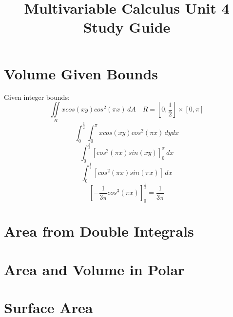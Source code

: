 \documentclass{article}
\title{Multivariable Calculus Unit 4 Study Guide}
\author{}
\date{}
\begin{document}
\maketitle

\section{Volume Given Bounds}
Given integer bounds:
\[
\iint\limits_{R} xcos(xy)cos^2(\pi x)\, dA \quad R = [0, \frac{1}{2}] \times [0, \pi ]
\]
\[
\int_{0}^{\frac{1}{2}} \int_{0}^{\pi} xcos(xy)cos^2(\pi x)\, dydx    
\]
\[
\int_{0}^{\frac{1}{2}} \left[ cos^{2}(\pi x)sin(xy) \right]_{0}^{\pi} \, dx
\]
\[
\int_{0}^{\frac{1}{2}} \left[ cos^{2}(\pi x)sin(\pi x) \right] \, dx
\]
\[
\left[ -\frac{1}{3\pi} cos^{3}(\pi x) \right]_{0}^{\frac{1}{2}} = \frac{1}{3\pi}
\]


\section{Area from Double Integrals}

\section{Area and Volume in Polar}

\section{Surface Area}
\end{document}
